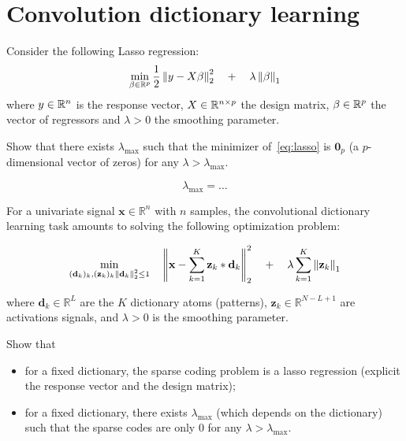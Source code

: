 \documentclass[11pt]{article}
\begin{document}
\section{Convolution dictionary learning}

\begin{exercise}
Consider the following Lasso regression:
\begin{equation}\label{eq:lasso}
    \min_{\beta\in\mathbb{R}^p} \frac{1}{2}\left\lVert y-X\beta\right\rVert^2_2 \quad + \quad \lambda \left\lVert\beta\right\rVert_1
\end{equation}
where $y\in\mathbb{R}^n$ is the response vector, $X\in\mathbb{R}^{n\times p}$ the design matrix, $\beta\in\mathbb{R}^p$ the vector of regressors and $\lambda>0$ the smoothing parameter.

Show that there exists $\lambda_{\max}$ such that the minimizer of~\eqref{eq:lasso} is $\mathbf{0}_p$ (a $p$-dimensional vector of zeros) for any $\lambda > \lambda_{\max}$.
\end{exercise}

\begin{solution}  %

\begin{equation}
    \lambda_{\max} = \dots
\end{equation}

\end{solution}

\begin{exercise}
For a univariate signal $\mathbf{x}\in\mathbb{R}^n$ with $n$ samples, the convolutional dictionary learning task amounts to solving the following optimization problem:

\begin{equation}
\min_{(\mathbf{d}_k)_k, (\mathbf{z}_k)_k \\ \left\lVert\mathbf{d}_k\right\rVert_2^2\leq 1} \quad\left\lVert\mathbf{x} - \sum_{k=1}^K \mathbf{z}_k * \mathbf{d}_k \right\rVert^2_2 \quad + \quad\lambda \sum_{k=1}^K \left\lVert\mathbf{z}_k\right\rVert_1
\end{equation}

where $\mathbf{d}_k\in\mathbb{R}^L$ are the $K$ dictionary atoms (patterns), $\mathbf{z}_k\in\mathbb{R}^{N-L+1}$ are activations signals, and $\lambda>0$ is the smoothing parameter.

Show that
\begin{itemize}
    \item for a fixed dictionary, the sparse coding problem is a lasso regression (explicit the response vector and the design matrix);
    \item for a fixed dictionary, there exists $\lambda_{\max}$ (which depends on the dictionary) such that the sparse codes are only 0 for any $\lambda > \lambda_{\max}$.
\end{itemize}
\end{exercise}
\end{document}
